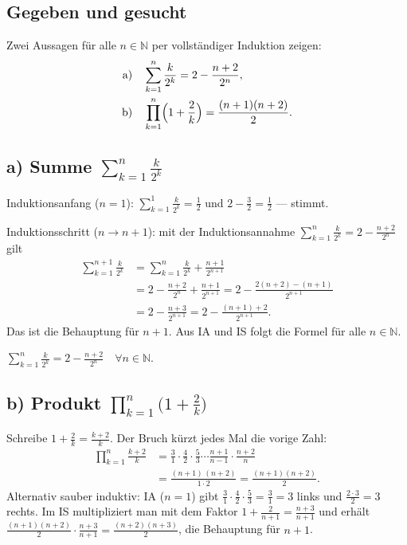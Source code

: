 
\subsection*{Gegeben und gesucht}
Zwei Aussagen für alle $n\in\mathbb N$ per vollständiger Induktion zeigen:
\begin{align}
  \text{a)}\quad &\sum_{k=1}^{n}\frac{k}{2^k}=2-\frac{n+2}{2^n}, \\
  \text{b)}\quad &\prod_{k=1}^{n}\Bigl(1+\frac2k\Bigr)=\frac{(n+1)(n+2)}2.
\end{align}

\subsection*{a) Summe $\sum_{k=1}^{n}\frac{k}{2^k}$}
Induktionsanfang ($n=1$): $\sum_{k=1}^{1}\frac{k}{2^k}=\frac12$ und
$2-\frac{3}{2}=\frac12$ — stimmt.

Induktionsschritt ($n\to n+1$): mit der Induktionsannahme
$\sum_{k=1}^{n}\frac{k}{2^k}=2-\frac{n+2}{2^n}$ gilt
\begin{align}
  \sum_{k=1}^{n+1}\frac{k}{2^k}
  &=\sum_{k=1}^{n}\frac{k}{2^k}+\frac{n+1}{2^{n+1}} \\
  &=2-\frac{n+2}{2^n}+\frac{n+1}{2^{n+1}}
  =2-\frac{2(n+2)-(n+1)}{2^{n+1}} \\
  &=2-\frac{n+3}{2^{n+1}}
  =2-\frac{(n+1)+2}{2^{n+1}}.
\end{align}
Das ist die Behauptung für $n+1$. Aus IA und IS folgt die Formel für alle
$n\in\mathbb N$.

\begin{ergebnis}
$\displaystyle\sum_{k=1}^{n}\frac{k}{2^k}=2-\frac{n+2}{2^n}\quad\forall n\in\mathbb N$.
\end{ergebnis}

\subsection*{b) Produkt $\prod_{k=1}^{n}\bigl(1+\tfrac2k\bigr)$}
Schreibe $1+\frac2k=\frac{k+2}{k}$. Der Bruch kürzt jedes Mal die vorige
Zahl:
\begin{align}
  \prod_{k=1}^{n}\frac{k+2}{k}
  &=\frac{3}{1}\cdot\frac{4}{2}\cdot\frac{5}{3}\cdots\frac{n+1}{n-1}\cdot\frac{n+2}{n} \\
  &=\frac{(n+1)\,(n+2)}{1\cdot 2}
  =\frac{(n+1)(n+2)}2.
\end{align}
Alternativ sauber induktiv: IA ($n=1$) gibt $\frac{3}{1}\cdot\frac{4}{2}\cdot\frac{5}{3}=\frac{3}{1}=3$ links und $\frac{2\cdot3}{2}=3$ rechts. Im IS multipliziert man mit
dem Faktor $1+\frac{2}{n+1}=\frac{n+3}{n+1}$ und erhält
$\frac{(n+1)(n+2)}{2}\cdot\frac{n+3}{n+1}=\frac{(n+2)(n+3)}2$, die
Behauptung für $n+1$.

